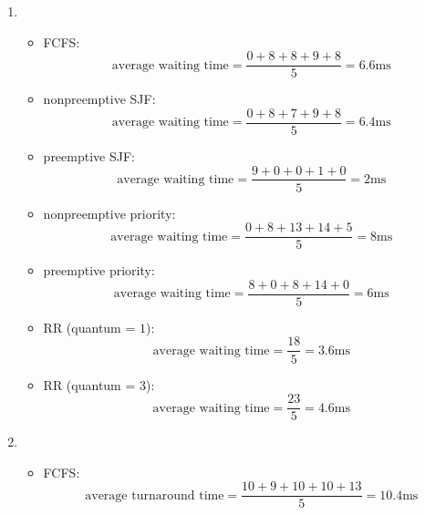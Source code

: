 \documentclass[12pt,a4paper]{article}
\begin{document}
\begin{enumerate}
\begin{enumerate}
					
				\item 
					\begin{itemize}
						\item FCFS: $$\textrm{average waiting time} = \frac{0+8+8+9+8}{5} = 6.6 \textrm{ms}$$
						
						\item nonpreemptive SJF: $$\textrm{average waiting time} = \frac{0+8+7+9+8}{5} = 6.4 \textrm{ms}$$
						
						\item preemptive SJF: $$\textrm{average waiting time} = \frac{9+0+0+1+0}{5} = 2 \textrm{ms}$$
						
						\item nonpreemptive priority: $$\textrm{average waiting time} = \frac{0+8+13+14+5}{5} = 8 \textrm{ms}$$
						
						\item preemptive priority: $$\textrm{average waiting time} = \frac{8+0+8+14+0}{5} = 6 \textrm{ms}$$
						
						\item RR (quantum = $1$): $$\textrm{average waiting time} = \frac{18}{5} = 3.6 \textrm{ms}$$
						
						\item RR (quantum = $3$): $$\textrm{average waiting time} = \frac{23}{5} = 4.6 \textrm{ms}$$
					
					\end{itemize}
				\item 
					\begin{itemize}
						\item FCFS: $$\textrm{average turnaround time} = \frac{10+9+10+10+13}{5} = 10.4 \textrm{ms}$$
						

\end{itemize}
\end{enumerate}
\end{enumerate}
\end{document}
